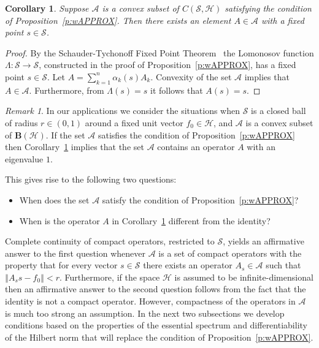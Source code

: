 \documentclass{tran-l}
\newtheorem{cor}[thm]{Corollary}
\theoremstyle{definition}
\theoremstyle{remark}
\newtheorem{rem}[thm]{Remark}
\numberwithin{equation}{subsection}
\newcommand{\To}{\longrightarrow}
\newcommand{\h}{\mathcal{H}}
\newcommand{\s}{\mathcal{S}}
\newcommand{\A}{\mathcal{A}}
\newcommand{\BH}{\mathbf{B}(\mathcal{H})}
\newcommand{\norm}[1]{\left\Vert#1\right\Vert}
\begin{document}
\begin{cor} \label{c:wAPPROX}
Suppose $\A$ is a convex subset of $C(\s,\h)$ satisfying the condition of Proposition~\ref{p:wAPPROX}. Then there exists an element $A\in\A$ with a fixed point $s\in\s$.
\end{cor}

\begin{proof}
By the Schauder-Tychonoff Fixed Point Theorem~\cite[p.~456]{DS57} the Lomonosov function $\Lambda\colon\s\To\s$, constructed in the proof of Proposition~\ref{p:wAPPROX}, has a fixed point $s\in\s$. Let $A=\sum_{k=1}^n\alpha_k(s)A_k$. Convexity of the set $\A$ implies that $A\in\A$. Furthermore, from $\Lambda(s)=s$ it follows that $A(s)=s$.
\end{proof}

\begin{rem}
In our applications we consider the situations when $\s$ is a closed ball of radius $r\in(0,1)$ around a fixed unit vector $f_0\in\h$, and $\A$ is a convex subset of $\BH$. If the set $\A$ satisfies the condition of Proposition~\ref{p:wAPPROX} then Corollary~\ref{c:wAPPROX} implies that the set $\A$ contains an operator $A$ with an eigenvalue $1$.

This gives rise to the following two questions:
\begin{itemize}
  \item{When does the set $\A$ satisfy the condition of
        Proposition~\ref{p:wAPPROX}?}
  \item{When is the operator $A$ in Corollary~\ref{c:wAPPROX}
        different from the identity?}
\end{itemize}

Complete continuity of compact operators, restricted to $\s$, yields an affirmative answer to the first question whenever $\A$ is a set of compact operators with the property that for every vector $s\in\s$ there exists an operator $A_s\in\A$ such that $\norm{A_s{s}-f_0}<r$. Furthermore, if the space $\h$ is assumed to be infinite-dimensional then an affirmative answer to the second question follows from the fact that the identity is not a compact operator. However, compactness of the operators in $\A$ is much too strong an assumption. In the next two subsections we develop conditions based on the properties of the essential spectrum and differentiability of the Hilbert norm that will replace the condition of Proposition~\ref{p:wAPPROX}.
\end{rem}

\end{document}
